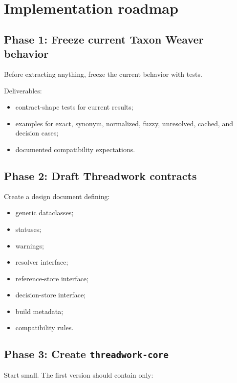 \documentclass[11pt,a4paper]{article}
\newcommand{\code}[1]{\texttt{#1}}
\begin{document}
\section{Implementation roadmap}

\subsection{Phase 1: Freeze current Taxon Weaver behavior}

Before extracting anything, freeze the current behavior with tests.

Deliverables:

\begin{itemize}
  \item contract-shape tests for current results;
  \item examples for exact, synonym, normalized, fuzzy, unresolved, cached, and decision cases;
  \item documented compatibility expectations.
\end{itemize}

\subsection{Phase 2: Draft Threadwork contracts}

Create a design document defining:

\begin{itemize}
  \item generic dataclasses;
  \item statuses;
  \item warnings;
  \item resolver interface;
  \item reference-store interface;
  \item decision-store interface;
  \item build metadata;
  \item compatibility rules.
\end{itemize}

\subsection{Phase 3: Create \code{threadwork-core}}

Start small. The first version should contain only:
\end{document}
